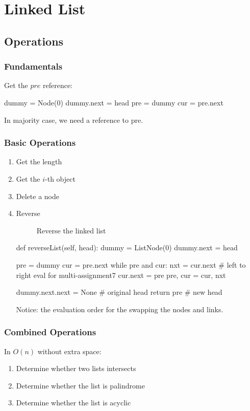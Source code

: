 \chapter{Linked List}


\section{Operations}
\subsection{Fundamentals}
Get the $pre$ reference:
\begin{python}
dummy = Node(0)
dummy.next = head
pre = dummy
cur = pre.next
\end{python}

In majority case, we need a reference to pre.

\subsection{Basic Operations}
\begin{enumerate}
\item Get the length
\item Get the $i$-th object
\item Delete a node 
\item Reverse
\begin{figure}[]
\centering
{}
\caption{Reverse the linked list}
\label{fig:LABEL}
\end{figure}
\begin{python}
def reverseList(self, head):
    dummy = ListNode(0)
    dummy.next = head

    pre = dummy
    cur = pre.next
    while pre and cur:
        nxt = cur.next
        # left to right eval for multi-assignment7
        cur.next = pre
        pre, cur = cur, nxt

    dummy.next.next = None  # original head
    return pre  # new head
\end{python}
Notice: the evaluation order for the swapping the nodes and links. 
\end{enumerate}

\subsection{Combined Operations}
In $O(n)$ without extra space:
\begin{enumerate}
\item Determine whether two lists intersects
\item Determine whether the list is palindrome 
\item Determine whether the list is acyclic
\end{enumerate}

